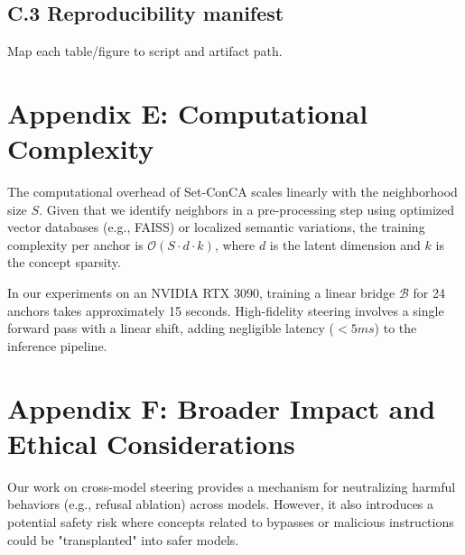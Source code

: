 \documentclass{article}
\begin{document}
\subsection{C.3 Reproducibility manifest}
Map each table/figure to script and artifact path.
\begin{table}[h]
\centering
\caption{Full Reproducibility Manifest linking claims to reproducible artifacts.}
\label{tab:manifest}
\end{table}

\section{Appendix E: Computational Complexity}
\label{app:complexity}
The computational overhead of Set-ConCA scales linearly with the neighborhood size $S$. Given that we identify neighbors in a pre-processing step using optimized vector databases (e.g., FAISS) or localized semantic variations, the training complexity per anchor is $\mathcal{O}(S \cdot d \cdot k)$, where $d$ is the latent dimension and $k$ is the concept sparsity. 

In our experiments on an NVIDIA RTX 3090, training a linear bridge $\mathcal{B}$ for 24 anchors takes approximately 15 seconds. High-fidelity steering involves a single forward pass with a linear shift, adding negligible latency ($<5ms$) to the inference pipeline.

\section{Appendix F: Broader Impact and Ethical Considerations}
\label{app:ethics}
Our work on cross-model steering provides a mechanism for neutralizing harmful behaviors (e.g., refusal ablation) across models. However, it also introduces a potential safety risk where concepts related to bypasses or malicious instructions could be "transplanted" into safer models. 
\end{document}

